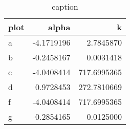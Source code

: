 \begin{table}[ht]
\centering
\begin{tabular}{lrr}
  \hline
plot & alpha & k \\ 
  \hline
a & -4.1719196 & 2.7845870 \\ 
  b & -0.2458167 & 0.0031418 \\ 
  c & -4.0408414 & 717.6995365 \\ 
  d & 0.9728453 & 272.7810669 \\ 
  f & -4.0408414 & 717.6995365 \\ 
  g & -0.2854165 & 0.0125000 \\ 
   \hline
\end{tabular}
\caption{caption} 
\label{tab:fitting_insideLambda_uniform_phi0_nm400_dynamic_oneToOne_allowUnlinked}
\end{table}
